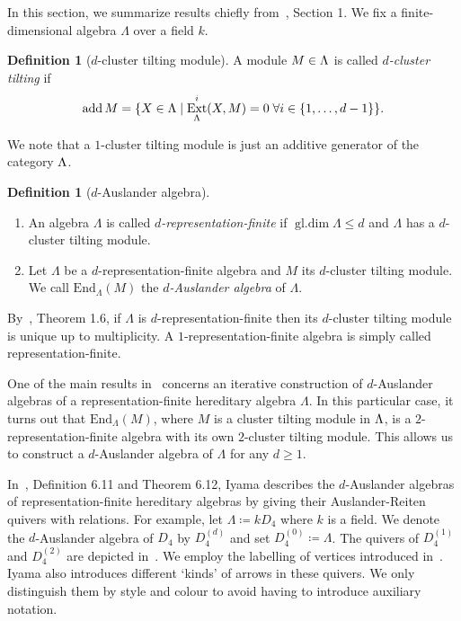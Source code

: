 \documentclass[a4paper,oneside,svgnames]{amsart}
\theoremstyle{plain}
\theoremstyle{definition}
\newtheorem{definition}[theorem]{Definition}
\let\mod\relax
\DeclareMathOperator{\ext}{Ext}
\DeclareMathOperator{\add}{add}
\DeclareMathOperator{\mod}{mod}
\DeclareMathOperator{\gldim}{gl.dim}
\begin{document}
 In this section, we summarize results chiefly from~\cite{iyama}, Section 1. We
 fix a finite-dimensional algebra $\Lambda$ over a field $k$.

 \begin{definition}[$d$-cluster tilting module]
  A module $M \in \mod \Lambda$ is called \emph{$d$-cluster tilting} if
  \[
   \add M = \{X \in \mod \Lambda \mid \ext^{i}_{\Lambda}(X,M) = 0 \; \forall i
   \in \{1,\ldots,d-1\}\}.
  \]
 \end{definition}
 We note that a $1$-cluster tilting module is just an additive generator of the
 category $\mod \Lambda$.
 \begin{definition}[$d$-Auslander algebra]
  \leavevmode
  \begin{enumerate}
   \item An algebra $\Lambda$ is called \emph{$d$-representation-finite} if
    $\gldim\Lambda \leq d$ and $\Lambda$ has a $d$-cluster tilting module.
   \item Let $\Lambda$ be a $d$-representation-finite algebra and $M$ its
    $d$-cluster tilting module. We call $\mathrm{End}_{\Lambda}(M)$ the
    \emph{$d$-Auslander algebra} of $\Lambda$.
  \end{enumerate}
 \end{definition}

 By~\cite{iyama}, Theorem 1.6, if $\Lambda$ is $d$-representation-finite then
 its $d$-cluster tilting module is unique up to multiplicity. A
 $1$-representation-finite algebra is simply called representation-finite.

 One of the main results in~\cite{iyama} concerns an iterative construction of
 $d$-Auslander algebras of a representation-finite hereditary algebra $\Lambda$.
 In this particular case, it turns out that $\mathrm{End}_{\Lambda}(M)$, where
 $M$ is a cluster tilting module in $\mod\Lambda$, is a
 $2$-representation-finite algebra with its own $2$-cluster tilting module. This
 allows us to construct a $d$-Auslander algebra of $\Lambda$ for any $d \geq 1$.

 In~\cite{iyama}, Definition 6.11 and Theorem 6.12, Iyama describes the
 $d$-Auslander algebras of representation-finite hereditary algebras by giving
 their Auslander-Reiten quivers with relations. For example, let $\Lambda
 \coloneqq kD_4$ where $k$ is a field. We denote the $d$-Auslander algebra of
 $D_4$ by $D_4^{(d)}$ and set $D_4^{(0)} \coloneqq \Lambda$. The quivers of
 $D_4^{(1)}$ and $D_4^{(2)}$ are depicted in~. We employ
 the labelling of vertices introduced in~\cite{iyama}. Iyama also introduces
 different `kinds' of arrows in these quivers. We only distinguish them by style
 and colour to avoid having to introduce auxiliary notation.
\end{document}

